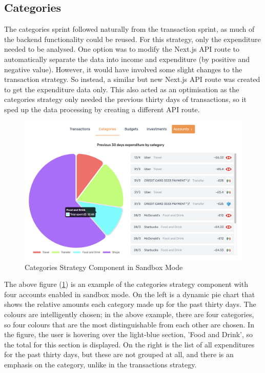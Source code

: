 \subsection{Categories}
The categories sprint followed naturally from the transaction sprint, as much of the backend functionality could be reused. For this strategy, only the expenditure needed to be analysed. One option was to modify the Next.js API route to automatically separate the data into income and expenditure (by positive and negative value). However, it would have involved some slight changes to the transaction strategy. So instead, a similar but new Next.js API route was created to get the expenditure data only. This also acted as an optimisation as the categories strategy only needed the previous thirty days of transactions, so it sped up the data processing by creating a different API route.

\begin{figure}[H]
	\centering
	\includegraphics[width=\textwidth]{images/categories_sandbox.png}
	\caption{Categories Strategy Component in Sandbox Mode}
	\label{fig:CategoriesStrategySandbox}
\end{figure}

The above figure (\ref{fig:CategoriesStrategySandbox}) is an example of the categories strategy component with four accounts enabled in sandbox mode. On the left is a dynamic pie chart that shows the relative amounts each category made up for the past thirty days. The colours are intelligently chosen; in the above example, there are four categories, so four colours that are the most distinguishable from each other are chosen. In the figure, the user is hovering over the light-blue section, 'Food and Drink', so the total for this section is displayed. On the right is the list of all expenditures for the past thirty days, but these are not grouped at all, and there is an emphasis on the category, unlike in the transactions strategy.

